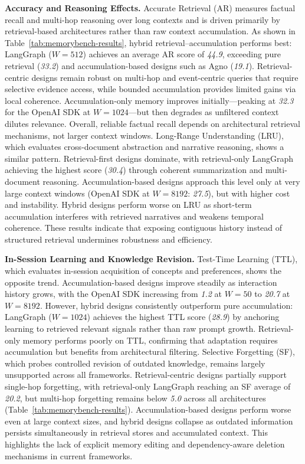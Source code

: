 \noindent\textbf{Accuracy and Reasoning Effects.}
Accurate Retrieval (AR) measures factual recall and multi-hop reasoning over long contexts and is driven primarily by retrieval-based architectures rather than raw context accumulation. As shown in Table~\ref{tab:memorybench-results}, hybrid retrieval–accumulation performs best: LangGraph ($W{=}512$) achieves an average AR score of \emph{44.9}, exceeding pure retrieval (\emph{33.2}) and accumulation-based designs such as Agno (\emph{19.1}). Retrieval-centric designs remain robust on multi-hop and event-centric queries that require selective evidence access, while bounded accumulation provides limited gains via local coherence. Accumulation-only memory improves initially—peaking at \emph{32.3} for the OpenAI SDK at $W{=}1024$—but then degrades as unfiltered context dilutes relevance. Overall, reliable factual recall depends on architectural retrieval mechanisms, not larger context windows.
%
Long-Range Understanding (LRU), which evaluates cross-document abstraction and narrative reasoning, shows a similar pattern. Retrieval-first designs dominate, with retrieval-only LangGraph achieving the highest score (\emph{30.4}) through coherent summarization and multi-document reasoning. Accumulation-based designs approach this level only at very large context windows (OpenAI SDK at $W{=}8192$: \emph{27.5}), but with higher cost and instability. Hybrid designs perform worse on LRU as short-term accumulation interferes with retrieved narratives and weakens temporal coherence. These results indicate that exposing contiguous history instead of structured retrieval undermines robustness and efficiency.


\smallskip
\noindent\textbf{In-Session Learning and Knowledge Revision.}
Test-Time Learning (TTL), which evaluates in-session acquisition of concepts and preferences, shows the opposite trend. Accumulation-based designs improve steadily as interaction history grows, with the OpenAI SDK increasing from \emph{1.2} at $W{=}50$ to \emph{20.7} at $W{=}8192$. However, hybrid designs consistently outperform pure accumulation: LangGraph ($W{=}1024$) achieves the highest TTL score (\emph{28.9}) by anchoring learning to retrieved relevant signals rather than raw prompt growth. Retrieval-only memory performs poorly on TTL, confirming that adaptation requires accumulation but benefits from architectural filtering.
%
Selective Forgetting (SF), which probes controlled revision of outdated knowledge, remains largely unsupported across all frameworks. Retrieval-centric designs partially support single-hop forgetting, with retrieval-only LangGraph reaching an SF average of \emph{20.2}, but multi-hop forgetting remains below \emph{5.0} across all architectures (Table~\ref{tab:memorybench-results}). Accumulation-based designs perform worse even at large context sizes, and hybrid designs collapse as outdated information persists simultaneously in retrieval stores and accumulated context. This highlights the lack of explicit memory editing and dependency-aware deletion mechanisms in current frameworks.


